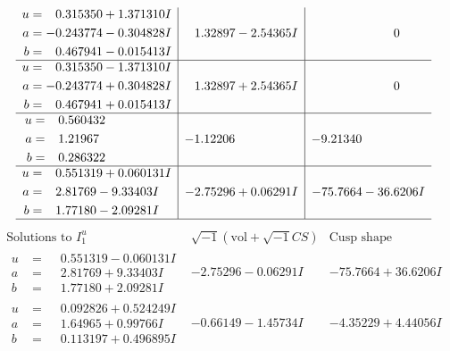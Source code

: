 \documentclass[1p]{elsarticle_modified}
\theoremstyle{definition}
\newcommand{\I}{\sqrt{-1}}
\begin{document}
$$\begin{array}{c|c|c}
\begin{aligned}
u &= \phantom{-}0.315350 + 1.371310 I \\
a &= -0.243774 - 0.304828 I \\
b &= \phantom{-}0.467941 - 0.015413 I\end{aligned}
 & \phantom{-}1.32897 - 2.54365 I & \phantom{-0.000000 } 0 \\ \hline\begin{aligned}
u &= \phantom{-}0.315350 - 1.371310 I \\
a &= -0.243774 + 0.304828 I \\
b &= \phantom{-}0.467941 + 0.015413 I\end{aligned}
 & \phantom{-}1.32897 + 2.54365 I & \phantom{-0.000000 } 0 \\ \hline\begin{aligned}
u &= \phantom{-}0.560432\phantom{ +0.000000I} \\
a &= \phantom{-}1.21967\phantom{ +0.000000I} \\
b &= \phantom{-}0.286322\phantom{ +0.000000I}\end{aligned}
 & -1.12206\phantom{ +0.000000I} & -9.21340\phantom{ +0.000000I} \\ \hline\begin{aligned}
u &= \phantom{-}0.551319 + 0.060131 I \\
a &= \phantom{-}2.81769 - 9.33403 I \\
b &= \phantom{-}1.77180 - 2.09281 I\end{aligned}
 & -2.75296 + 0.06291 I & -75.7664 - 36.6206 I\\
 \hline 
 \end{array}$$\newpage$$\begin{array}{c|c|c}  
\text{Solutions to }I^u_{1}& \I (\text{vol} + \sqrt{-1}CS) & \text{Cusp shape}\\
 \hline 
\begin{aligned}
u &= \phantom{-}0.551319 - 0.060131 I \\
a &= \phantom{-}2.81769 + 9.33403 I \\
b &= \phantom{-}1.77180 + 2.09281 I\end{aligned}
 & -2.75296 - 0.06291 I & -75.7664 + 36.6206 I \\ \hline\begin{aligned}
u &= \phantom{-}0.092826 + 0.524249 I \\
a &= \phantom{-}1.64965 + 0.99766 I \\
b &= \phantom{-}0.113197 + 0.496895 I\end{aligned}
 & -0.66149 - 1.45734 I & -4.35229 + 4.44056 I \\ \hline\begin{aligned}

\end{aligned}
\end{array}$$
\end{document}
